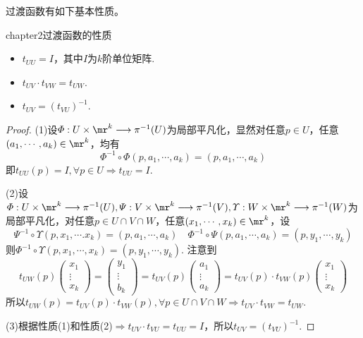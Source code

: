 过渡函数有如下基本性质。
\begin{mythm}{}{chapter2过渡函数的性质}
	\begin{itemize}
		\item[(1)] $t_{UU}=I$，其中$I$为$k$阶单位矩阵. 
		\item[(2)] $t_{UV}\cdot t_{VW}=t_{UW}$. 
		\item[(3)] $t_{UV}=\left(t_{VU} \right)^{-1}$.
	\end{itemize}
\end{mythm}
\begin{proof}
	(1)设$\varPhi:U\times\mr^{k}\longrightarrow \pi^{-1}(U)$为局部平凡化，显然对任意$p\in U$，任意$(a_{1},\cdots,a_{k})\in \mr^{k}$，均有
	\[
	\varPhi^{-1}\circ\varPhi(p,a_{1},\cdots,a_{k})=(p,a_{1},\cdots,a_{k})
	\]
	即$t_{UU}(p)=I,\forall p\in U\Rightarrow t_{UU}=I$. 
	
	(2)设$\varPhi:U\times\mr^{k}\longrightarrow \pi^{-1}(U),\varPsi:V\times\mr^{k}\longrightarrow \pi^{-1}(V),\varUpsilon:W\times\mr^{k}\longrightarrow \pi^{-1}(W)$为局部平凡化，对任意$p\in U\cap V\cap W$，任意$(x_{1},\cdots,x_{k})\in \mr^{k}$，设
	\[
	\varPsi^{-1}\circ\varUpsilon(p,x_{1},\cdots.x_{k})=(p,a_{1},\cdots,a_{k})\quad\varPhi^{-1}\circ\varPsi(p,a_{1},\cdots,a_{k})=(p,y_{1},\cdots,y_{k})
	\]
	则$\varPhi^{-1}\circ\varUpsilon(p,x_{1},\cdots,x_{k})=(p,y_{1},\cdots,y_{k})$. 注意到
	\[
	t_{UW}(p) \left( \begin{array}{ccc}{x_{1}} \\ {\vdots}  \\ {x_{k}} \end{array}\right)=\left( \begin{array}{ccc}{y_{1}} \\ {\vdots}  \\ {b_{k}} \end{array}\right)=t_{UV}(p) \left( \begin{array}{ccc}{a_{1}} \\ {\vdots}  \\ {a_{k}} \end{array}\right)=t_{UV}(p)\cdot t_{VW}(p) \left( \begin{array}{ccc}{x_{1}} \\ {\vdots}  \\ {x_{k}} \end{array}\right)
	\]
	所以$t_{UW}(p)=t_{UV}(p)\cdot t_{VW}(p),\forall p\in U\cap V\cap W\Rightarrow t_{UV}\cdot t_{VW}=t_{UW}$.
	
	(3)根据性质(1)和性质(2)$\Rightarrow t_{UV}\cdot t_{VU}=t_{UU}=I$，所以$t_{UV}=\left(t_{VU} \right)^{-1}$. 
\end{proof}

